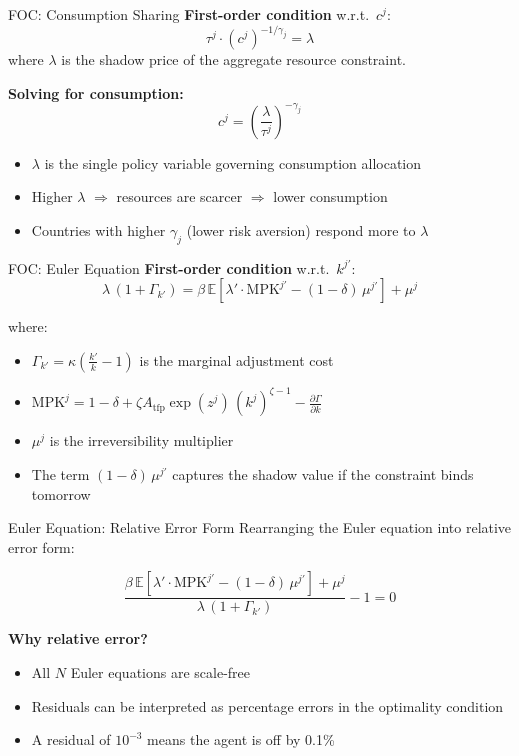\documentclass[aspectratio=169,11pt]{beamer}
\newcommand{\emphc}[1]{\textcolor{harvardcrimson}{#1}}
\newcommand{\E}[1]{\mathbb{E}\!\left[#1\right]}
\begin{document}
\begin{frame}{FOC: Consumption Sharing}
\textbf{First-order condition} w.r.t.\ $c^j$:
\[
\tau^j \cdot (c^j)^{-1/\gamma_j} = \lambda
\]
where $\lambda$ is the \emphc{shadow price} of the aggregate resource constraint.

\vspace{0.5em}
\textbf{Solving for consumption:}
\[
\boxed{c^j = \left(\frac{\lambda}{\tau^j}\right)^{-\gamma_j}}
\]

\vspace{0.5em}
\begin{itemize}
    \item $\lambda$ is the \emphc{single} policy variable governing consumption allocation
    \item Higher $\lambda$ $\Rightarrow$ resources are scarcer $\Rightarrow$ lower consumption
    \item Countries with higher $\gamma_j$ (lower risk aversion) respond more to $\lambda$
\end{itemize}
\end{frame}

\begin{frame}{FOC: Euler Equation}
\textbf{First-order condition} w.r.t.\ $k^{j\prime}$:
\[
\lambda\,(1 + \Gamma_{k'}) = \beta\,\E{\lambda' \cdot \text{MPK}^{j\prime} - (1-\delta)\,\mu^{j\prime}} + \mu^j
\]

where:
\begin{itemize}
    \item $\Gamma_{k'} = \kappa\!\left(\frac{k'}{k} - 1\right)$ is the marginal adjustment cost
    \item $\text{MPK}^j = 1 - \delta + \zeta A_{\text{tfp}} \exp(z^j)\,(k^j)^{\zeta-1} - \frac{\partial \Gamma}{\partial k}$
    \item $\mu^j$ is the \emphc{irreversibility multiplier}
    \item The term $(1-\delta)\,\mu^{j\prime}$ captures the \emphc{shadow value} if the constraint binds tomorrow
\end{itemize}
\end{frame}

\begin{frame}{Euler Equation: Relative Error Form}
Rearranging the Euler equation into \emphc{relative error} form:

\[
\boxed{
\frac{\beta\,\E{\lambda' \cdot \text{MPK}^{j\prime} - (1-\delta)\,\mu^{j\prime}} + \mu^j}{\lambda\,(1 + \Gamma_{k'})} - 1 = 0
}
\]

\vspace{0.5em}
\textbf{Why relative error?}
\begin{itemize}
    \item All $N$ Euler equations are \emphc{scale-free}
    \item Residuals can be interpreted as \emphc{percentage errors} in the optimality condition
    \item A residual of $10^{-3}$ means the agent is off by 0.1\%
\end{itemize}
\end{frame}
\end{document}
